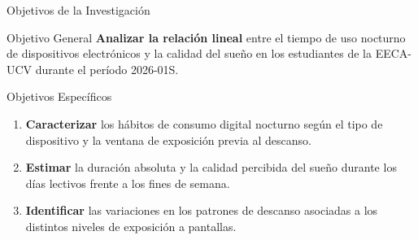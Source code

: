 \documentclass[10pt, aspectratio=169]{beamer}
\begin{document}
\begin{frame}{Objetivos de la Investigación}
    \begin{block}{Objetivo General}
        \textbf{Analizar la relación lineal} entre el tiempo de uso nocturno de dispositivos electrónicos y la calidad del sueño en los estudiantes de la EECA-UCV durante el período 2026-01S.
    \end{block}

    \vspace{0.3cm}
    \begin{exampleblock}{Objetivos Específicos}
        \begin{enumerate}
            \item \textbf{Caracterizar} los hábitos de consumo digital nocturno según el tipo de dispositivo y la ventana de exposición previa al descanso.
            \item \textbf{Estimar} la duración absoluta y la calidad percibida del sueño durante los días lectivos frente a los fines de semana.
            \item \textbf{Identificar} las variaciones en los patrones de descanso asociadas a los distintos niveles de exposición a pantallas.
        \end{enumerate}
    \end{exampleblock}
\end{frame}
\end{document}
